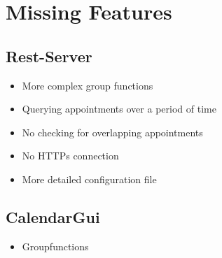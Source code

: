 \documentclass[12pt]{scrartcl}
\begin{document}
    \section{Missing Features}
    \subsection{Rest-Server}
    \begin{itemize}
        \item More complex group functions
        \item Querying appointments over a period of time
        \item No checking for overlapping appointments
        \item No HTTPs connection
        \item More detailed configuration file
    \end{itemize}
    \subsection{CalendarGui}
    \begin{itemize}
        \item Groupfunctions
    \end{itemize}

\end{document}

